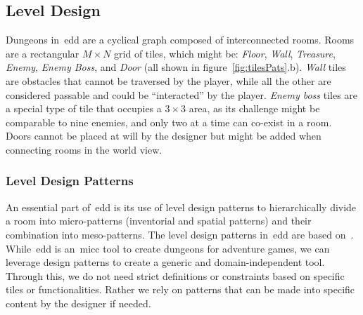 
\subsection{Level Design}

Dungeons in~\acrshort{edd} are a cyclical graph composed of interconnected rooms. Rooms are a rectangular $M \times N$ grid of tiles, which might be: \emph{Floor}, \emph{Wall}, \emph{Treasure}, \emph{Enemy}, \emph{Enemy Boss}, and \emph{Door} (all shown in figure~\ref{fig:tilesPats}.b). \emph{Wall} tiles are obstacles that cannot be traversed by the player, while all the other are considered passable and could be ``interacted'' by the player. \emph{Enemy boss} tiles are a special type of tile that occupies a $3\times3$ area, as its challenge might be comparable to nine enemies, and only two at a time can co-exist in a room. Doors cannot be placed at will by the designer but might be added when connecting rooms in the world view. 

\subsubsection{Level Design Patterns}

An essential part of~\acrshort{edd} is its use of level design patterns to hierarchically divide a room into micro-patterns (inventorial and spatial patterns) and their combination into meso-patterns. The level design patterns in~\acrshort{edd} are based on~\cite{bjork_patterns_2004,dahlskog_patterns_2015,dahlskog_procedural_2014}. While~\acrshort{edd} is an~\acrshort{micc} tool to create dungeons for adventure games, we can leverage design patterns to create a generic and domain-independent tool. Through this, we do not need strict definitions or constraints based on specific tiles or functionalities. Rather we rely on patterns that can be made into specific content by the designer if needed.


